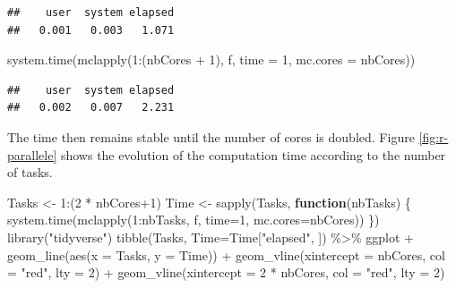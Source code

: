 \documentclass[
  12pt,
  american,
  a4paper,
  extrafontsizes,onecolumn,openright
  ]{memoir}
\newenvironment{Shaded}{\begin{snugshade}}{\end{snugshade}}
\newcommand{\AttributeTok}[1]{\textcolor[rgb]{0.77,0.63,0.00}{#1}}
\newcommand{\ControlFlowTok}[1]{\textcolor[rgb]{0.13,0.29,0.53}{\textbf{#1}}}
\newcommand{\DecValTok}[1]{\textcolor[rgb]{0.00,0.00,0.81}{#1}}
\newcommand{\FunctionTok}[1]{\textcolor[rgb]{0.00,0.00,0.00}{#1}}
\newcommand{\NormalTok}[1]{#1}
\newcommand{\OtherTok}[1]{\textcolor[rgb]{0.56,0.35,0.01}{#1}}
\newcommand{\SpecialCharTok}[1]{\textcolor[rgb]{0.00,0.00,0.00}{#1}}
\newcommand{\StringTok}[1]{\textcolor[rgb]{0.31,0.60,0.02}{#1}}
\begin{document}
\begin{verbatim}
##    user  system elapsed 
##   0.001   0.003   1.071
\end{verbatim}

\begin{Shaded}
\begin{Highlighting}[]
\FunctionTok{system.time}\NormalTok{(}\FunctionTok{mclapply}\NormalTok{(}\DecValTok{1}\SpecialCharTok{:}\NormalTok{(nbCores }\SpecialCharTok{+} \DecValTok{1}\NormalTok{), f, }\AttributeTok{time =} \DecValTok{1}\NormalTok{, }\AttributeTok{mc.cores =}\NormalTok{ nbCores))}
\end{Highlighting}
\end{Shaded}

\begin{verbatim}
##    user  system elapsed 
##   0.002   0.007   2.231
\end{verbatim}

\normalsize

The time then remains stable until the number of cores is doubled.
Figure \ref{fig:r-parallele} shows the evolution of the computation time according to the number of tasks.



\scriptsize

\begin{Shaded}
\begin{Highlighting}[]
\NormalTok{Tasks }\OtherTok{\textless{}{-}} \DecValTok{1}\SpecialCharTok{:}\NormalTok{(}\DecValTok{2} \SpecialCharTok{*}\NormalTok{ nbCores}\SpecialCharTok{+}\DecValTok{1}\NormalTok{)}
\NormalTok{Time }\OtherTok{\textless{}{-}} \FunctionTok{sapply}\NormalTok{(Tasks, }\ControlFlowTok{function}\NormalTok{(nbTasks) \{}
      \FunctionTok{system.time}\NormalTok{(}\FunctionTok{mclapply}\NormalTok{(}\DecValTok{1}\SpecialCharTok{:}\NormalTok{nbTasks, f, }\AttributeTok{time=}\DecValTok{1}\NormalTok{, }\AttributeTok{mc.cores=}\NormalTok{nbCores))}
\NormalTok{              \})}
\FunctionTok{library}\NormalTok{(}\StringTok{"tidyverse"}\NormalTok{)}
\FunctionTok{tibble}\NormalTok{(Tasks, }\AttributeTok{Time=}\NormalTok{Time[}\StringTok{"elapsed"}\NormalTok{, ]) }\SpecialCharTok{\%\textgreater{}\%} 
\NormalTok{  ggplot }\SpecialCharTok{+}
  \FunctionTok{geom\_line}\NormalTok{(}\FunctionTok{aes}\NormalTok{(}\AttributeTok{x =}\NormalTok{ Tasks, }\AttributeTok{y =}\NormalTok{ Time)) }\SpecialCharTok{+}
  \FunctionTok{geom\_vline}\NormalTok{(}\AttributeTok{xintercept =}\NormalTok{ nbCores, }\AttributeTok{col =} \StringTok{"red"}\NormalTok{, }\AttributeTok{lty =} \DecValTok{2}\NormalTok{) }\SpecialCharTok{+}
  \FunctionTok{geom\_vline}\NormalTok{(}\AttributeTok{xintercept =} \DecValTok{2} \SpecialCharTok{*}\NormalTok{ nbCores, }\AttributeTok{col =} \StringTok{"red"}\NormalTok{, }\AttributeTok{lty =} \DecValTok{2}\NormalTok{)}
\end{Highlighting}
\end{Shaded}
\end{document}
